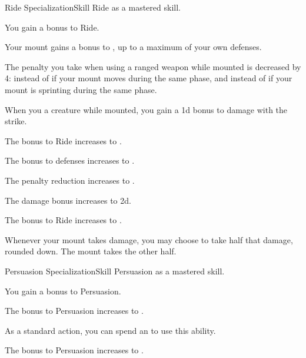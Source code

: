     \begin{feat}{Ride Specialization}{Skill}
        \featpre Ride as a mastered skill.
        \featben

         You gain a  bonus to Ride.

         Your mount gains a  bonus to , up to a maximum of your own defenses.

         The penalty you take when using a ranged weapon while mounted is decreased by 4:  instead of  if your mount moves during the same phase, and  instead of  if your mount is sprinting during the same phase.

         When you  a creature while mounted, you gain a \plus1d bonus to damage with the strike.

         The bonus to Ride increases to .

         The bonus to defenses increases to .

         The penalty reduction increases to .

         The damage bonus increases to \plus2d.

         The bonus to Ride increases to .

         Whenever your mount takes  damage, you may choose to take half that damage, rounded down.
        The mount takes the other half.
    \end{feat}

    \begin{feat}{Persuasion Specialization}{Skill}
        \featpre Persuasion as a mastered skill.
        \featben

         You gain a  bonus to Persuasion.

        \ff[2]{}

         The bonus to Persuasion increases to .

         As a standard action, you can spend an  to use this ability.

         The bonus to Persuasion increases to .
    \end{feat}

